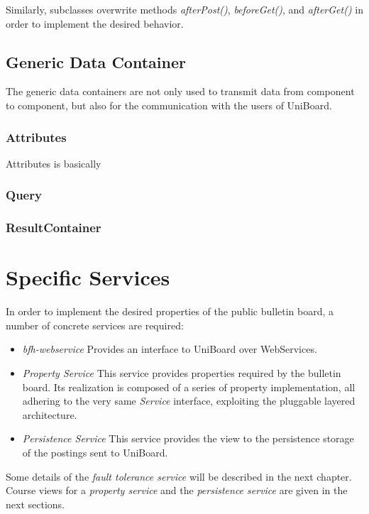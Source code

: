 \documentclass[oneside]{scrreprt}
\newcommand{\uniboard}{\mbox{UniBoard}}
\begin{document}
Similarly, subclasses overwrite methods \emph{afterPost()},
\emph{beforeGet()}, and \emph{afterGet()} in order to implement
the desired behavior.


\section{Generic Data Container}
The generic data containers are not only used to transmit data from component to component, but also for the communication with the users of UniBoard.

\subsection{Attributes}
Attributes is basically 
\subsection{Query}

\subsection{ResultContainer}

\chapter{Specific Services}

In order to implement the desired properties of the public bulletin board,
 a number of concrete services are required:

\begin{itemize}
	\item \emph{bfh-webservice} Provides an interface to UniBoard over WebServices.
	\item \emph{Property Service} This service provides properties required by the bulletin board. Its
		realization is composed of a series of property
		implementation, all adhering to the very same
		\emph{Service} interface, exploiting the pluggable
		layered architecture.
	\item \emph{Persistence Service} This service provides
		the view to the persistence storage of the postings
		sent to \uniboard.
\end{itemize}

Some details of the \emph{fault tolerance service} will be described
in the next chapter. Course views for a \emph{property service}
and the \emph{persistence service} are given in the next sections.
\end{document}
